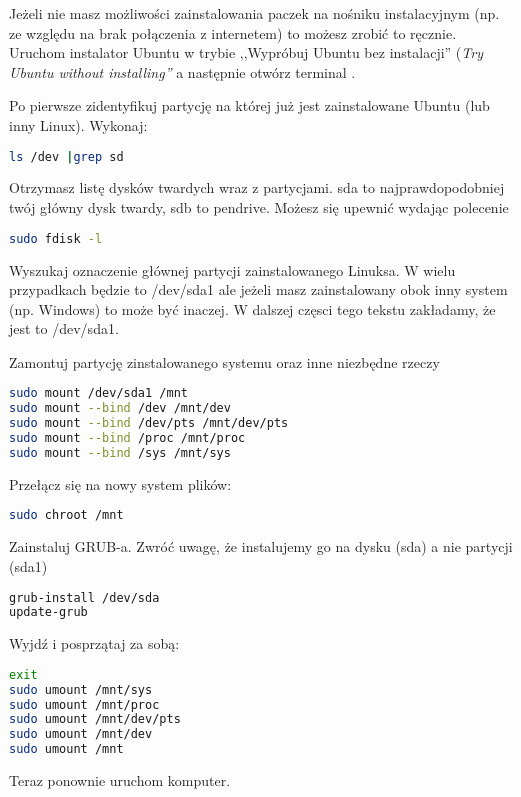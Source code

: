 Jeżeli nie masz możliwości zainstalowania paczek na nośniku instalacyjnym (np. ze względu na brak połączenia z internetem) to możesz zrobić to ręcznie. Uruchom instalator Ubuntu w trybie ,,Wypróbuj Ubuntu bez instalacji'' (\textit{Try Ubuntu without installing''} a następnie otwórz terminal .

Po pierwsze zidentyfikuj partycję na której już jest zainstalowane Ubuntu (lub inny Linux). Wykonaj:

\begin{lstlisting}[language=bash]
ls /dev |grep sd
\end{lstlisting}

Otrzymasz listę dysków twardych wraz z partycjami. \textcolor{ubuntu_orange}{sda} to najprawdopodobniej twój główny dysk twardy, sdb to pendrive. Możesz się upewnić wydając polecenie

\begin{lstlisting}[language=bash]
sudo fdisk -l
\end{lstlisting}

Wyszukaj oznaczenie głównej partycji zainstalowanego Linuksa. W wielu przypadkach będzie to /dev/sda1 ale jeżeli masz zainstalowany obok inny system (np. Windows) to może być inaczej. W dalszej częsci tego tekstu zakładamy, że jest to /dev/sda1.

Zamontuj partycję zinstalowanego systemu oraz inne niezbędne rzeczy
\begin{lstlisting}[language=bash]
sudo mount /dev/sda1 /mnt
sudo mount --bind /dev /mnt/dev
sudo mount --bind /dev/pts /mnt/dev/pts
sudo mount --bind /proc /mnt/proc
sudo mount --bind /sys /mnt/sys
\end{lstlisting}

Przełącz się na nowy system plików:

\begin{lstlisting}[language=bash]
sudo chroot /mnt
\end{lstlisting}

Zainstaluj GRUB-a. Zwróć uwagę, że instalujemy go na dysku (sda) a nie partycji (sda1)

\begin{lstlisting}[language=bash]
grub-install /dev/sda
update-grub
\end{lstlisting}

Wyjdź i posprzątaj za sobą:

\begin{lstlisting}[language=bash]
exit
sudo umount /mnt/sys
sudo umount /mnt/proc
sudo umount /mnt/dev/pts
sudo umount /mnt/dev
sudo umount /mnt
\end{lstlisting}

Teraz ponownie uruchom komputer.
